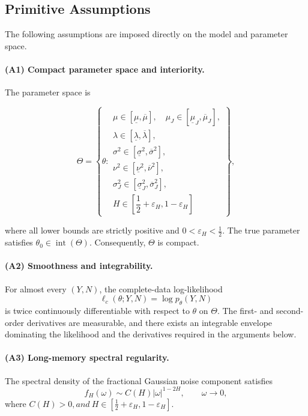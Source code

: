 \documentclass[a4paper,11pt]{amsart}
\theoremstyle{definition}
\theoremstyle{plain}
\theoremstyle{remark}
\newcommand{\1}{\mathbf{1}}
\begin{document}
\subsection{Primitive Assumptions}

The following assumptions are imposed directly on the model and parameter space.

\paragraph{(A1) Compact parameter space and interiority.}
The parameter space is

$$
\Theta= \left\{ \theta:
\begin{array}{l}
\mu\in[\underline{\mu},\overline{\mu}],
\quad
\mu_J\in[\underline{\mu}_J,\overline{\mu}_J],
\\[1mm]
\lambda\in[\underline{\lambda},\overline{\lambda}],
\\[1mm]
\sigma^2\in[\underline{\sigma}^2,\overline{\sigma}^2],
\\[1mm]
\nu^2\in[\underline{\nu}^2,\overline{\nu}^2],
\\[1mm]
\sigma_J^2\in
[\underline{\sigma}_J^2,\overline{\sigma}_J^2],
\\[1mm]
H\in
\left[
\dfrac12+\varepsilon_H,
1-\varepsilon_H
\right]
\end{array}
\right\},
$$

where all lower bounds are strictly positive and
$
0<\varepsilon_H<\frac12.
$
The true parameter satisfies
$
\theta_0\in\operatorname{int}(\Theta).
$
Consequently, $\Theta$ is compact.

\paragraph{(A2) Smoothness and integrability.}
For almost every $(Y,N)$, the complete-data log-likelihood
$$
\ell_c(\theta;Y,N)
=
\log p_\theta(Y,N)
$$
is twice continuously differentiable with respect to $\theta$ on $\Theta$. The first- and second-order derivatives are measurable, and there exists an integrable envelope dominating the likelihood and the derivatives required in the arguments below.

\paragraph{(A3) Long-memory spectral regularity.}
The spectral density of the fractional Gaussian noise component satisfies
$$
f_H(\omega)
\sim
C(H)|\omega|^{1-2H},
\qquad
\omega\to0,
$$
where
$
C(H)>0, and  \ H\in
\left[
\frac12+\varepsilon_H,
1-\varepsilon_H
\right].
$
\end{document}
